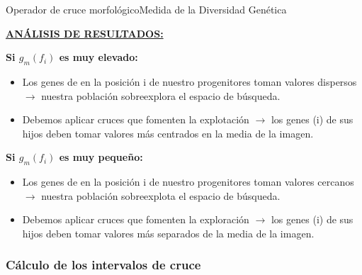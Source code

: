 \documentclass[10pt]{beamer}
\begin{document}
			
			
			\begin{frame}{Operador de cruce morfol\'ogico}{Medida de la Diversidad Gen\'etica}
				\begin{center}
					\underline{\textbf{AN\'ALISIS DE RESULTADOS:}}
				\end{center}
				
				\textbf{Si $g_{m}(f_{i})$ es muy elevado:}
				\begin{itemize}
					\item Los genes de en la posici\'on i de nuestro progenitores toman valores dispersos $\rightarrow$ nuestra poblaci\'on sobreexplora el espacio de b\'usqueda.
					\item  Debemos aplicar cruces que fomenten la explotaci\'on $\rightarrow$ los genes (i) de sus hijos deben tomar valores m\'as centrados en la media de la imagen.
				\end{itemize}
				
				\textbf{Si $g_{m}(f_{i})$ es muy peque\~{n}o:}
				\begin{itemize}
					\item Los genes de en la posici\'on i de nuestro progenitores toman valores cercanos $\rightarrow$ nuestra poblaci\'on sobreexplota el espacio de b\'usqueda.
					\item  Debemos aplicar cruces que fomenten la exploraci\'on $\rightarrow$ los genes (i) de sus hijos deben tomar valores m\'as separados de la media de la imagen.
				\end{itemize}
				
			\end{frame}

\subsubsection{Cálculo de los intervalos de cruce}
\end{document}
